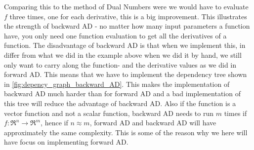 Comparing this to the method of Dual Numbers were we would have to evaluate $f$ three times, one for each derivative, this is a big improvement. This illustrates the strength of backward AD - no matter how many input parameters a function have, you only need one function evaluation to get all the derivatives of a function. The disadvantage of backward AD is that when we implement this, in differ from what we did in the example above when we did it by hand, we still only want to carry along the function- and the derivative values as we did in forward AD. This means that we have to implement the dependency tree shown in \autoref{fig:depency_graph_backward_AD}. This makes the implementation of backward AD much harder than for forward AD and a bad implementation of this tree will reduce the advantage of backward AD. Also if the function is a vector function and not a scalar function, backward AD needs to run $m$ times if $f: \Re^n \rightarrow \Re^m$, hence if $n\approx m$, forward AD and backward AD will have approximately the same complexity. This is some of the reason why we here will have focus on implementing forward AD.

